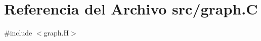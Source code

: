 \hypertarget{graph_8_c}{}\section{Referencia del Archivo src/graph.C}
\label{graph_8_c}
{\ttfamily \#include $<$graph.\+H$>$}\newline

